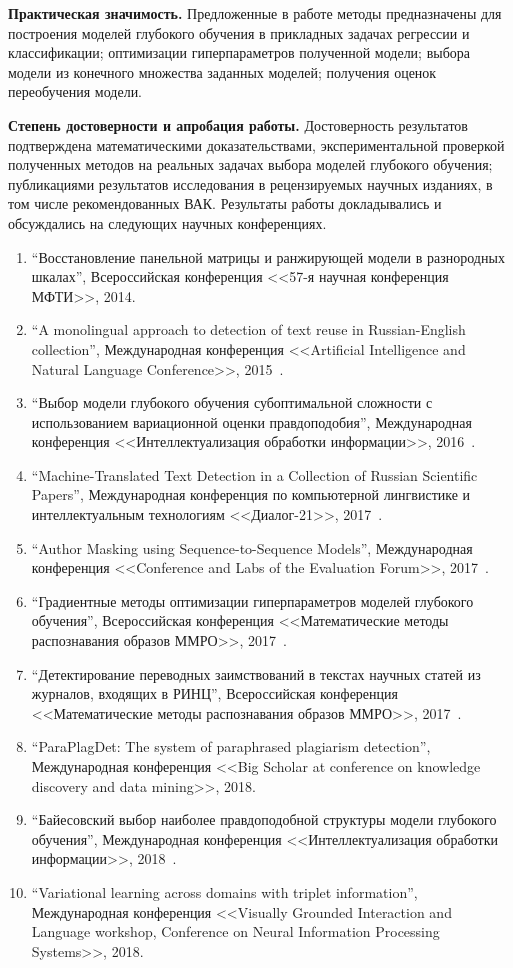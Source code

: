 \documentclass[11pt, a5paper]{dissert}
\theoremstyle{definition}
\begin{document}
\vspace{0.5cm}
\textbf{Практическая значимость.} Предложенные в работе методы предназначены для построения моделей глубокого обучения в прикладных задачах регрессии и классификации; оптимизации гиперпараметров полученной модели; выбора модели из конечного множества заданных моделей; получения оценок переобучения модели.


\vspace{0.5cm}
\textbf{Степень достоверности и апробация работы.} Достоверность результатов подтверждена математическими доказательствами, экспериментальной проверкой полученных методов на реальных задачах выбора моделей глубокого обучения; публикациями результатов исследования в рецензируемых научных изданиях, в том числе рекомендованных ВАК. Результаты работы докладывались и обсуждались на следующих научных конференциях.
\begin{enumerate}
\item ``Восстановление панельной матрицы и ранжирующей модели в разнородных шкалах'', Всероссийская конференция <<57-я научная конференция МФТИ>>, 2014.
\item ``A monolingual approach to detection of text reuse in Russian-English collection'', Международная конференция <<Artificial Intelligence and Natural Language Conference>>, 2015~\cite{monolingual}.
\item ``Выбор модели глубокого обучения субоптимальной сложности с использованием вариационной оценки правдоподобия'', Международная конференция <<Интеллектуализация обработки информации>>, 2016~\cite{ioi16}.
\item ``Machine-Translated Text Detection in a Collection of Russian
Scientific Papers'', Международная конференция по компьютерной лингвистике и интеллектуальным технологиям <<Диалог-21>>, 2017~\cite{dialog}.
\item ``Author Masking using Sequence-to-Sequence Models'', Международная конференция <<Conference and Labs of the Evaluation Forum>>, 2017~\cite{pan_s2s}.
\item ``Градиентные методы оптимизации гиперпараметров моделей глубокого обучения'', Всероссийская конференция <<Математические методы распознавания образов ММРО>>, 2017~\cite{mmro17_hyper}.
\item ``Детектирование переводных заимствований в текстах научных статей из журналов, входящих в РИНЦ'', Всероссийская конференция <<Математические методы распознавания образов ММРО>>, 2017~\cite{mmro17_plag}.
\item ``ParaPlagDet: The system of paraphrased plagiarism detection'', Международная конференция <<Big Scholar at conference on knowledge discovery and data mining>>, 2018.
\item ``Байесовский выбор наиболее правдоподобной структуры модели глубокого обучения'', Международная конференция <<Интеллектуализация обработки информации>>, 2018~\cite{ioi18}.
\item ``Variational learning across domains with triplet
information'', Международная конференция <<Visually Grounded Interaction and Language workshop, Conference on Neural Information Processing Systems>>, 2018.
\end{enumerate}
\end{document}
